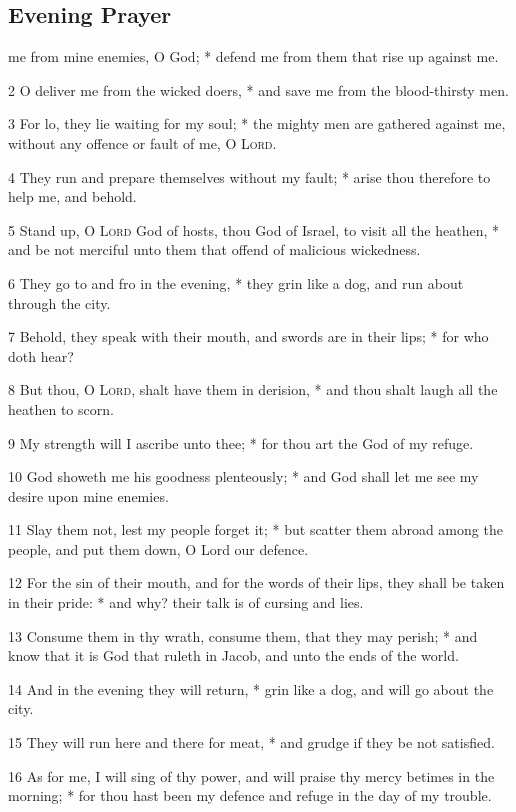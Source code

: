 \subsection{Evening Prayer}
 me from mine enemies, O God; * defend me from them that rise up against me.\par
2 O deliver me from the wicked doers, * and save me from the blood-thirsty men.\par
3 For lo, they lie waiting for my soul; * the mighty men are gathered against me, without any offence or fault of me, O {\textsc{Lord}}.\par
4 They run and prepare themselves without my fault; * arise thou therefore to help me, and behold.\par
5 Stand up, O {\textsc{Lord}} God of hosts, thou God of Israel, to visit all the heathen, * and be not merciful unto them that offend of malicious wickedness.\par
6 They go to and fro in the evening, * they grin like a dog, and run about through the city.\par
7 Behold, they speak with their mouth, and swords are in their lips; * for who doth hear?\par
8 But thou, O {\textsc{Lord}}, shalt have them in derision, * and thou shalt laugh all the heathen to scorn.\par
9 My strength will I ascribe unto thee; * for thou art the God of my refuge.\par
10 God showeth me his goodness plenteously; * and God shall let me see my desire upon mine enemies.\par
11 Slay them not, lest my people forget it; * but scatter them abroad among the people, and put them down, O Lord our defence.\par
12 For the sin of their mouth, and for the words of their lips, they shall be taken in their pride: * and why? their talk is of cursing and lies.\par
13 Consume them in thy wrath, consume them, that they may perish; * and know that it is God that ruleth in Jacob, and unto the ends of the world.\par
14 And in the evening they will return, * grin like a dog, and will go about the city.\par
15 They will run here and there for meat, * and grudge if they be not satisfied.\par
16 As for me, I will sing of thy power, and will praise thy mercy betimes in the morning; * for thou hast been my defence and refuge in the day of my trouble.\par

